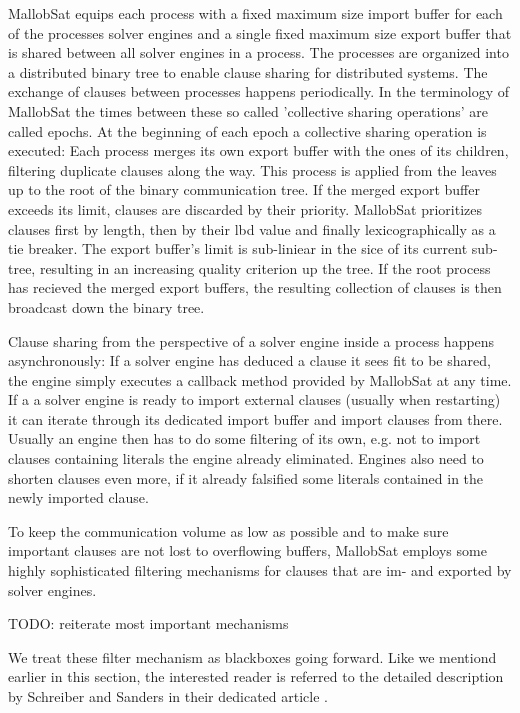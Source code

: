 \documentclass[12pt,a4paper,twoside]{scrartcl}
\numberwithin{equation}{section}
\begin{document}
MallobSat equips each process with a fixed maximum size import buffer for each of the processes solver engines and a single fixed maximum size export buffer that is shared between all solver engines in a process. The processes are organized into a distributed binary tree to enable clause sharing for distributed systems. The exchange of clauses between processes happens periodically. In the terminology of MallobSat the times between these so called 'collective sharing operations' are called epochs.
At the beginning of each epoch a collective sharing operation is executed: Each process merges its own export buffer with the ones of its children, filtering duplicate clauses along the way. This process is applied from the leaves up to the root of the binary communication tree. If the merged export buffer exceeds its limit, clauses are discarded by their priority. MallobSat prioritizes clauses first by length, then by their lbd value and finally lexicographically as a tie breaker. The export buffer's limit is sub-liniear in the sice of its current sub-tree, resulting in an increasing quality criterion up the tree. If the root process has recieved the merged export buffers, the resulting collection of clauses is then broadcast down the binary tree.

Clause sharing from the perspective of a solver engine inside a process happens asynchronously: If a solver engine has deduced a clause it sees fit to be shared, the engine simply executes a callback method provided by MallobSat at any time. If a a solver engine is ready to import external clauses (usually when restarting) it can iterate through its dedicated import buffer and import clauses from there. Usually an engine then has to do some filtering of its own, e.g. not to import clauses containing literals the engine already eliminated. Engines also need to shorten clauses even more, if it already falsified some literals contained in the newly imported clause.

To keep the communication volume as low as possible and to make sure important clauses are not lost to overflowing buffers, MallobSat employs some highly sophisticated filtering mechanisms for clauses that are im- and exported by solver engines. 

TODO: reiterate most important mechanisms

We treat these filter mechanism as blackboxes going forward. Like we mentiond earlier in this section, the interested reader is referred to the detailed description by Schreiber and Sanders in their dedicated article \cite{mallobSat}.
\end{document}
